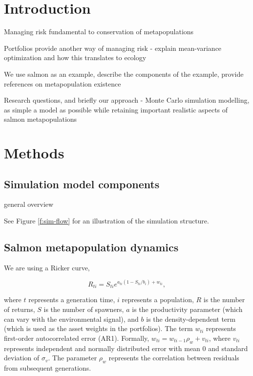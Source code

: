 \section{Introduction}

Managing risk fundamental to conservation of metapopulations

Portfolios provide another way of managing risk - explain mean-variance
optimization and how this translates to ecology \citep{Figge2004}
\citep{Hoekstra2012} \citep[\citet{Ando2012}]{Ando2011}
\citep[\citet{Markowitz1959}]{Markowitz1952}

We use salmon as an example, describe the components of the example,
provide references on metapopulation existence \citep{Schindler2010}

Research questions, and briefly our approach - Monte Carlo simulation
modelling, as simple a model as possible while retaining important
realistic aspects of salmon metapopulations

\section{Methods}

\subsection{Simulation model components}

general overview

See Figure \ref{f:sim-flow} for an illustration of the simulation
structure.

\subsection{Salmon metapopulation dynamics}

We are using a Ricker curve,

\begin{equation}
R_{ti} = S_{ti}e^{a_{ti}(1-S_{ti}/b_i) + w_{ti}},
\end{equation}

\noindent
where $t$ represents a generation time, $i$ represents a population, $R$
is the number of returns, $S$ is the number of spawners, $a$ is the
productivity parameter (which can vary with the environmental signal),
and $b$ is the density-dependent term (which is used as the asset
weights in the portfolios). The term $w_{ti}$ represents first-order
autocorrelated error (AR1). Formally,
$w_{ti} = w_{ti-1} \rho_w + v_{ti}$, where $v_{ti}$ represents
independent and normally distributed error with mean 0 and standard
deviation of $\sigma_v$. The parameter $\rho_w$ represents the
correlation between residuals from subsequent generations.

